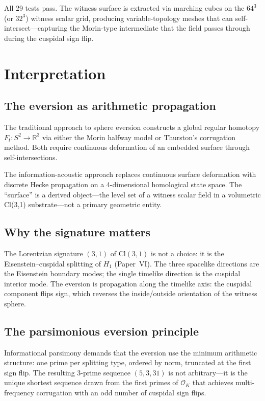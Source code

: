 \documentclass[11pt,a4paper]{article}
\theoremstyle{plain}
\theoremstyle{definition}
\theoremstyle{remark}
\numberwithin{equation}{section}
\providecommand{\Cl}{\mathrm{Cl}}
\providecommand{\RR}{\mathbb{R}}
\providecommand{\cO}{\mathcal{O}}
\begin{document}
All 29 tests pass.  The witness surface is extracted via marching cubes
on the $64^3$ (or $32^3$) witness scalar grid, producing variable-topology
meshes that can self-intersect---capturing the Morin-type intermediate
that the field passes through during the cuspidal sign flip.


\section{Interpretation}\label{sec:interpretation}

\subsection{The eversion as arithmetic propagation}

The traditional approach to sphere eversion constructs a global regular
homotopy $F_t: S^2 \to \RR^3$ via either the Morin halfway model or
Thurston's corrugation method.  Both require continuous deformation of
an embedded surface through self-intersections.

The information-acoustic approach replaces continuous surface deformation
with discrete Hecke propagation on a 4-dimensional homological state space.
The ``surface'' is a derived object---the level set of a witness scalar
field in a volumetric Cl(3,1) substrate---not a primary geometric entity.

\subsection{Why the signature matters}

The Lorentzian signature $(3,1)$ of $\Cl(3,1)$ is not a choice: it is
the Eisenstein--cuspidal splitting of $H_1$ (Paper~VI).  The three
spacelike directions are the Eisenstein boundary modes; the single
timelike direction is the cuspidal interior mode.  The eversion is
propagation along the timelike axis: the cuspidal component flips sign,
which reverses the inside/outside orientation of the witness sphere.

\subsection{The parsimonious eversion principle}

Informational parsimony demands that the eversion use the minimum
arithmetic structure: one prime per splitting type, ordered by norm,
truncated at the first sign flip.  The resulting 3-prime sequence
$(5, 3, 31)$ is not arbitrary---it is the unique shortest sequence
drawn from the first primes of $\cO_K$ that achieves multi-frequency
corrugation with an odd number of cuspidal sign flips.
\end{document}
